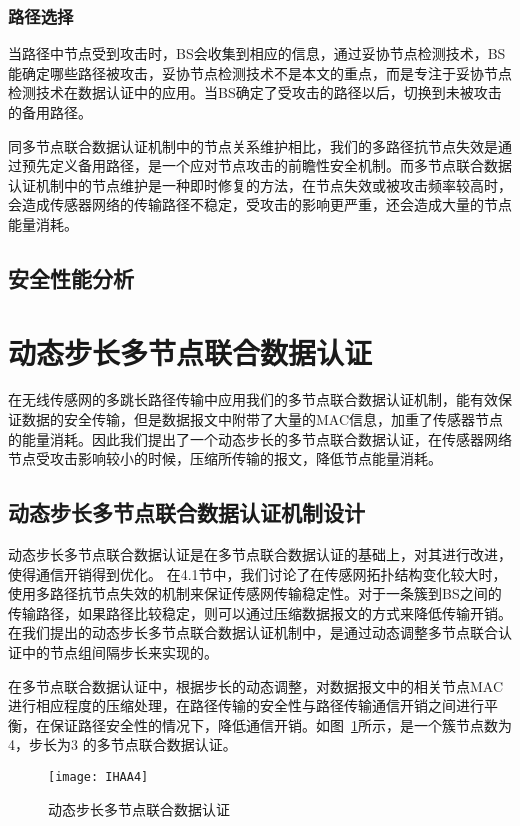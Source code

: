 \subsubsection{路径选择}
当路径中节点受到攻击时，BS会收集到相应的信息，通过妥协节点检测技术，BS能确定哪些路径被攻击，妥协节点检测技术不是本文的重点，而是专注于妥协节点检测技术在数据认证中的应用。当BS确定了受攻击的路径以后，切换到未被攻击的备用路径。

同多节点联合数据认证机制中的节点关系维护相比，我们的多路径抗节点失效是通过预先定义备用路径，是一个应对节点攻击的前瞻性安全机制。而多节点联合数据认证机制中的节点维护是一种即时修复的方法，在节点失效或被攻击频率较高时，会造成传感器网络的传输路径不稳定，受攻击的影响更严重，还会造成大量的节点能量消耗。
\subsection{安全性能分析}






\section{动态步长多节点联合数据认证}
在无线传感网的多跳长路径传输中应用我们的多节点联合数据认证机制，能有效保证数据的安全传输，但是数据报文中附带了大量的MAC信息，加重了传感器节点的能量消耗。因此我们提出了一个动态步长的多节点联合数据认证，在传感器网络节点受攻击影响较小的时候，压缩所传输的报文，降低节点能量消耗。
\subsection{动态步长多节点联合数据认证机制设计}
动态步长多节点联合数据认证是在多节点联合数据认证的基础上，对其进行改进，使得通信开销得到优化。
在4.1节中，我们讨论了在传感网拓扑结构变化较大时，使用多路径抗节点失效的机制来保证传感网传输稳定性。对于一条簇到BS之间的传输路径，如果路径比较稳定，则可以通过压缩数据报文的方式来降低传输开销。在我们提出的动态步长多节点联合数据认证机制中，是通过动态调整多节点联合认证中的节点组间隔步长来实现的。

在多节点联合数据认证中，根据步长的动态调整，对数据报文中的相关节点MAC进行相应程度的压缩处理，在路径传输的安全性与路径传输通信开销之间进行平衡，在保证路径安全性的情况下，降低通信开销。如图~\ref{fig:IHAA4}所示，是一个簇节点数为4，步长为3 的多节点联合数据认证。
\begin{figure}[htbp]
  \centering
  \texttt{[image: IHAA4]}
  \caption{动态步长多节点联合数据认证}
  \label{fig:IHAA4}
\end{figure}
